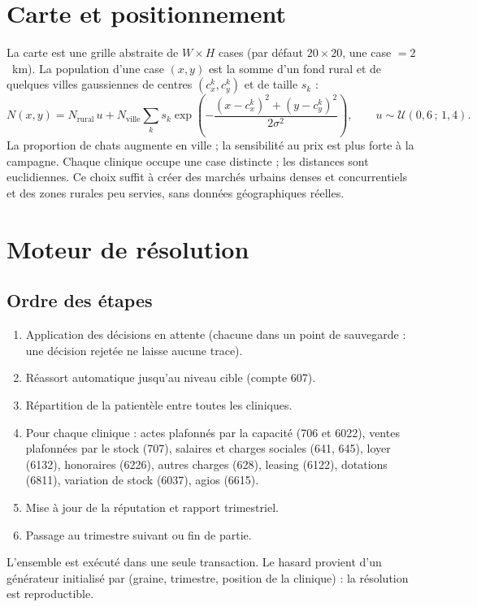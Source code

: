 \documentclass[11pt,a4paper]{article}
\begin{document}
\section{Carte et positionnement}

La carte est une grille abstraite de $W \times H$ cases (par défaut
$20 \times 20$, une case $= 2$~km). La population d'une case $(x,y)$ est
la somme d'un fond rural et de quelques villes gaussiennes de centres
$(c_x^k, c_y^k)$ et de taille $s_k$ :
\[
  N(x,y) = N_{\text{rural}}\,u + N_{\text{ville}} \sum_k s_k
  \exp\!\left(-\frac{(x-c_x^k)^2 + (y-c_y^k)^2}{2\sigma^2}\right),
  \qquad u \sim \mathcal{U}(0{,}6\,;\,1{,}4).
\]
La proportion de chats augmente en ville ; la sensibilité au prix est plus
forte à la campagne. Chaque clinique occupe une case distincte ; les
distances sont euclidiennes. Ce choix suffit à créer des marchés urbains
denses et concurrentiels et des zones rurales peu servies, sans données
géographiques réelles.

\section{Moteur de résolution}

\subsection{Ordre des étapes}

\begin{enumerate}
  \item Application des décisions en attente (chacune dans un point de
    sauvegarde : une décision rejetée ne laisse aucune trace).
  \item Réassort automatique jusqu'au niveau cible (compte 607).
  \item Répartition de la patientèle entre toutes les cliniques.
  \item Pour chaque clinique : actes plafonnés par la capacité (706 et 6022),
    ventes plafonnées par le stock (707), salaires et charges sociales (641,
    645), loyer (6132), honoraires (6226), autres charges (628), leasing
    (6122), dotations (6811), variation de stock (6037), agios (6615).
  \item Mise à jour de la réputation et rapport trimestriel.
  \item Passage au trimestre suivant ou fin de partie.
\end{enumerate}

L'ensemble est exécuté dans une seule transaction. Le hasard provient d'un
générateur initialisé par (graine, trimestre, position de la clinique) : la
résolution est reproductible.
\end{document}
